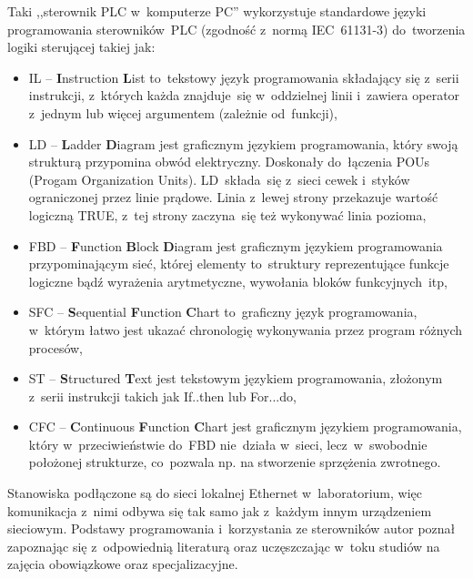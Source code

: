 Taki ,,sterownik PLC w~komputerze PC'' wykorzystuje standardowe języki programowania sterowników~PLC (zgodność z~normą IEC~61131-3) do~tworzenia logiki sterującej takiej jak:
\begin{itemize}
\item IL -- \textbf{I}nstruction \textbf{L}ist to~tekstowy język programowania składający się z~serii instrukcji, z~których każda znajduje~się w~oddzielnej linii i~zawiera operator z~jednym lub więcej argumentem (zależnie od~funkcji),

\item LD -- \textbf{L}adder \textbf{D}iagram jest graficznym językiem programowania, który swoją strukturą przypomina obwód elektryczny. Doskonały do~łączenia POUs (Progam Organization Units). LD~składa~się z~sieci cewek i~styków ograniczonej przez linie prądowe. Linia z~lewej strony przekazuje wartość logiczną TRUE, z~tej strony zaczyna~się też wykonywać linia pozioma,

\item FBD -- \textbf{F}unction \textbf{B}lock \textbf{D}iagram jest graficznym językiem programowania przypominającym sieć, której elementy to~struktury reprezentujące funkcje logiczne bądź wyrażenia arytmetyczne, wywołania bloków funkcyjnych~itp,

\item SFC -- \textbf{S}equential \textbf{F}unction \textbf{C}hart to~graficzny język programowania, w~którym łatwo jest ukazać chronologię wykonywania przez program różnych procesów,

\item ST -- \textbf{S}tructured \textbf{T}ext jest tekstowym językiem programowania, złożonym z~serii instrukcji takich jak If..then lub For...do,

\item CFC -- \textbf{C}ontinuous \textbf{F}unction \textbf{C}hart jest graficznym językiem programowania, który w~przeciwieństwie do~FBD nie~działa w~sieci, lecz~w~swobodnie położonej strukturze, co~pozwala np. na stworzenie sprzężenia zwrotnego.
\end{itemize}

\indent
\indent Stanowiska podłączone są do sieci lokalnej Ethernet w~laboratorium, więc komunikacja z~nimi odbywa się tak samo jak z~każdym innym urządzeniem sieciowym. Podstawy programowania i~korzystania ze sterowników autor poznał zapoznając się z~odpowiednią literaturą \cite{plc1,plc2,plc4,plc5,plc6} oraz uczęszczając w~toku studiów na zajęcia obowiązkowe oraz specjalizacyjne.

